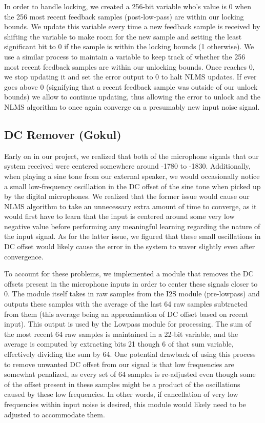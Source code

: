\documentclass{fpgairpods}
\begin{document}
In order to handle locking, we created a 256-bit variable  who's value is 0 when the 256 most recent feedback samples (post-low-pass) are within our locking bounds. We update this variable every time a new feedback sample is received by shifting the variable to make room for the new sample and setting the least significant bit to 0 if the sample is within the locking bounds (1 otherwise). We use a similar process to maintain a variable  to keep track of whether the 256 most recent feedback samples are within our unlocking bounds. Once  reaches 0, we stop updating it and set the error output to 0 to halt NLMS updates. If  ever goes above 0 (signifying that a recent feedback sample was outside of our unlock bounds) we allow  to continue updating, thus allowing the error to unlock and the NLMS algorithm to once again converge on a presumably new input noise signal.


\subsection{DC Remover (Gokul)}
Early on in our project, we realized that both of the microphone signals that our system received were centered somewhere around -1780 to -1830. Additionally, when playing a sine tone from our external speaker, we would occasionally notice a small low-frequency oscillation in the DC offset of the sine tone when picked up by the digital microphones. We realized that the former issue would cause our NLMS algorithm to take an unnecessary extra amount of time to converge, as it would first have to learn that the input is centered around some very low negative value before performing any meaningful learning regarding the nature of the input signal. As for the latter issue, we figured that these small oscillations in DC offset would likely cause the error in the system to waver slightly even after convergence.

To account for these problems, we implemented a module that removes the DC offsets present in the microphone inputs in order to center these signals closer to 0. The module itself takes in raw samples from the I2S module (pre-lowpass) and outputs these samples with the average of the last 64 raw samples subtracted from them (this average being an approximation of DC offset based on recent input). This output is used by the Lowpass module for processing. The sum of the most recent 64 raw samples is maintained in a 22-bit variable, and the average is computed by extracting bits 21 though 6 of that sum variable, effectively dividing the sum by 64. One potential drawback of using this process to remove unwanted DC offset from our signal is that low frequencies are somewhat penalized, as every set of 64 samples is re-adjusted even though some of the offset present in these samples might be a product of the oscillations caused by these low frequencies. In other words, if cancellation of very low frequencies within input noise is desired, this module would likely need to be adjusted to accommodate them.
\end{document}
